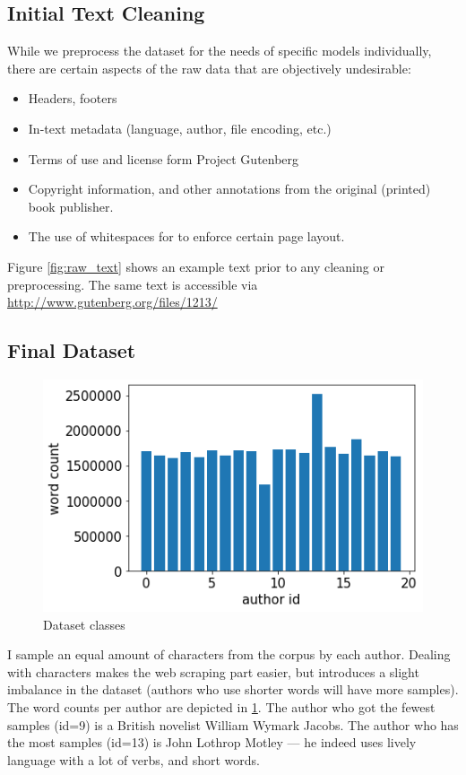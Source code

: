 \documentclass[journal,12pt,onecolumn]{IEEEtran}
\begin{document}
\subsection{Initial Text Cleaning}

\noindent While we preprocess the dataset for the needs of specific models individually, there are certain aspects of the raw data that are objectively undesirable:

\begin{itemize}
    \item Headers, footers
    \item In-text metadata (language, author, file encoding, etc.)
    \item Terms of use and license form Project Gutenberg
    \item Copyright information, and other annotations from the original (printed) book publisher.
    \item The use of whitespaces for to enforce certain page layout.
\end{itemize}
Figure \ref{fig:raw_text} shows an example text prior to any cleaning or preprocessing. The same text is accessible via \url{http://www.gutenberg.org/files/1213/}


\subsection{Final Dataset}
\begin{figure}[h]
    \centering
    \includegraphics[width=0.5\linewidth]{word_count.png}
    \caption{Dataset classes}
    \label{fig:word_count}
\end{figure}
I sample an equal amount of characters from the corpus by each author. Dealing with characters makes the web scraping part easier, but introduces a slight imbalance in the dataset (authors who use shorter words will have more samples). The word counts per author are depicted in \ref{fig:word_count}. The author who got the fewest samples (id=9) is a British novelist William Wymark Jacobs. The author who has the most samples (id=13) is John Lothrop Motley --- he indeed uses lively language with a lot of verbs, and short words.
\end{document}
